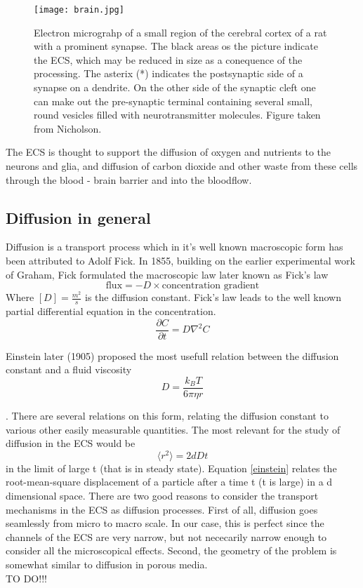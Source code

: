 \documentclass[a4paper,english, 12pt, twoside]{article}
\renewcommand{\d}{\partial}
\begin{document}
\begin{figure}[H]
 \centering
 \texttt{[image: brain.jpg]}
 \caption{Electron micrograhp of a small region of the cerebral cortex of a rat with a prominent synapse. 
 The black areas os the picture indicate the ECS, which may be reduced in size as a conequence of the processing. 
 The asterix (*) indicates the postsynaptic side of a synapse on a dendrite. 
 On the other side of the synaptic cleft one can make out the pre-synaptic terminal containing several small, round vesicles filled with neurotransmitter molecules. 
 Figure taken from Nicholson.}
 \label{ECS}
\end{figure}

The ECS is thought to support the diffusion of oxygen and nutrients to the neurons and glia, and diffusion of carbon dioxide and other waste from these cells through the blood - brain barrier and into the bloodflow. 

\subsection{Diffusion in general}
Diffusion is a transport process which in it's well known macroscopic form has been attributed to Adolf Fick. 
In 1855, building on the earlier experimental work of Graham, Fick formulated the macroscopic law later known as Fick's law
\begin{equation}
 \text{flux} = -D\times\text{concentration gradient}
\end{equation}
Where $[D] = \frac{m^2}{s}$ is the diffusion constant. Fick's law leads to the well known partial differential equation in the concentration.
\begin{equation}\label{diffusion_eq}
 \frac{\d C}{\d t} = D\nabla^2C
\end{equation}

Einstein later (1905) proposed the most usefull relation between the diffusion constant and a fluid viscosity 
\begin{equation}\label{einstein_viscosity}
D = \frac{k_B T}{6\pi \eta r}
\end{equation}

.
There are several relations on this form, relating the diffusion constant to various other easily measurable quantities. 
The most relevant for the study of diffusion in the ECS would be
\begin{equation}\label{einstein}
 \langle r^2\rangle = 2dDt
\end{equation}
in the limit of large t (that is in steady state). Equation \ref{einstein} relates the root-mean-square displacement of a particle after a time t (t is large) in a d dimensional space. 
There are two good reasons to consider the transport mechanisms in the ECS as diffusion processes. 
First of all, diffusion goes seamlessly from micro to macro scale. In our case, this is perfect since the channels of the ECS are very narrow, but not nececarily narrow enough to consider all the microscopical effects. Second, the geometry of the problem is somewhat similar to diffusion in porous media.\\
TO DO!!!
\end{document}
